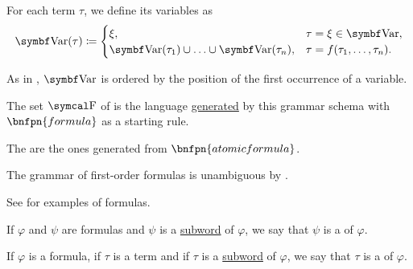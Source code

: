 \begin{definition}
\begin{DefEnum}
     For each term \( \tau \), we define its variables as
    \begin{equation}\label{eq:def:first_order_language/term_variables}
      \Bold{Var}(\tau) \coloneqq \begin{cases}
        \xi,                                                    &\tau = \xi \in \Bold{Var},        \\
        \Bold{Var}(\tau_1) \cup \ldots \cup \Bold{Var}(\tau_n), &\tau = f(\tau_1, \ldots, \tau_n).
      \end{cases}
    \end{equation}

    As in , \( \Bold{Var} \) is ordered by the position of the first occurrence of a variable.

     The set \( \CF \) of  is the language \hyperref[def:grammar_derivation/grammar_language]{generated} by this grammar schema with \( \bnfpn{formula} \) as a starting rule.

    The  are the ones generated from \( \bnfpn{atomic formula} \).

    The grammar of first-order formulas is unambiguous by .

    See  for examples of formulas.

     If \( \varphi \) and \( \psi \) are formulas and \( \psi \) is a \hyperref[def:language/subword]{subword} of \( \varphi \), we say that \( \psi \) is a  of \( \varphi \).

     If \( \varphi \) is a formula, if \( \tau \) is a term and if \( \tau \) is a \hyperref[def:language/subword]{subword} of \( \varphi \), we say that \( \tau \) is a  of \( \varphi \).


\end{DefEnum}
\end{definition}
